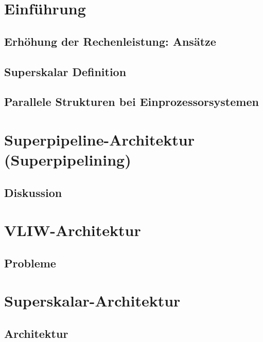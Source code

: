 \section{Einführung}
\subsection{Erhöhung der Rechenleistung: Ansätze}

\subsection{Superskalar Definition}
\subsection{Parallele Strukturen bei Einprozessorsystemen}

\section{Superpipeline-Architektur (Superpipelining)}

\subsection{Diskussion}

\section{VLIW-Architektur}


\subsection{Probleme}

\section{Superskalar-Architektur}

\subsection{Architektur}

